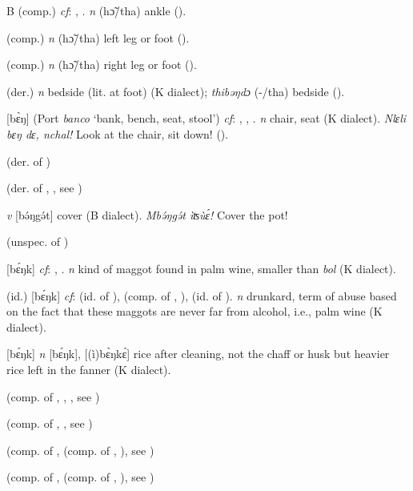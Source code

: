 \begin{letter}{B}
 (comp.) \textit{cf}: , . \textit{n} (hɔ̃/tha) ankle (\citealt{Pichl1967}). 

 (comp.) \textit{n} (hɔ̃/tha) left leg or foot (\citealt{Pichl1967}). 

 (comp.) \textit{n} (hɔ̃/tha) right leg or foot (\citealt{Pichl1967}). 

 (der.) \textit{n} bedside (lit. at foot) (K dialect); \textit{thibəŋdɔ} (-/tha) bedside (\citealt{Pichl1967}). 

 [bɛ̀ŋ] (Port \textit{banco} ‘bank, bench, seat, stool') \textit{cf}: , , . \textit{n} chair, seat (K dialect). \textit{Nlɛli bɛŋ dɛ, nchal!} Look at the chair, sit down! (\citealt{Pichl1967}). 

 (der. of ) 

 (der. of , , see ) 

 \textit{v} [bə́ŋgə́t] cover (B dialect). \textit{Mbə́ŋgə́t ìʦùɛ́!} Cover the pot! 

 (unspec. of )

 [bɛ́ŋk] \textit{cf}: , . \textit{n} kind of maggot found in palm wine, smaller than \textit{bol} (K dialect). 

 (id.) [bɛ́ŋk] \textit{cf}:  (id. of ),  (comp. of , ),  (id. of ). \textit{n} drunkard, term of abuse based on the fact that these maggots are never far from alcohol, i.e., palm wine (K dialect). 

 [bɛ́ŋk] \textit{n} [bɛ́ŋk], [(ì)bɛ̀ŋkɛ́] rice after cleaning, not the chaff or husk but heavier rice left in the fanner (K dialect). 

 (comp. of , , , see ) 

 (comp. of , , see ) 

 (comp. of ,  (comp. of , ), see ) 

 (comp. of ,  (comp. of , ), see ) 


\end{letter}
